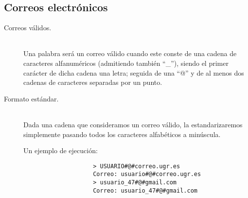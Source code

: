 \documentclass[12pt]{article}
\begin{document}
    \subsection{Correos electrónicos}
    \begin{description}
        \item [Correos válidos.]~\\
            Una palabra será un correo válido cuando este conste de una cadena de caracteres alfanuméricos (admitiendo también ``\_''), siendo el primer carácter de dicha cadena una letra; seguida de una ``@'' y de al menos dos cadenas de caracteres separadas por un punto.
        \item [Formato estándar.]~\\
            Dada una cadena que consideramos un correo válido, la estandarizaremos simplemente pasando todos los caracteres alfabéticos a minúscula.
            \begin{ejemplo}
                Un ejemplo de ejecución:
                \begin{verbatim}
                    > USUARIO#@#correo.ugr.es
                    Correo: usuario#@#correo.ugr.es
                    > usuario_47#@#gmail.com
                    Correo: usuario_47#@#gmail.com
                \end{verbatim}
            \end{ejemplo}
    \end{description}
\end{document}

